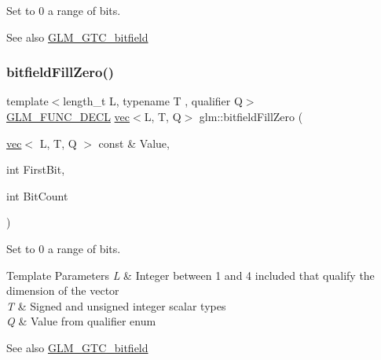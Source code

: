 Set to 0 a range of bits.

\begin{DoxySeeAlso}{See also}
\hyperlink{group__gtc__bitfield}{G\+L\+M\+\_\+\+G\+T\+C\+\_\+bitfield} 
\end{DoxySeeAlso}
\mbox{\label{group__gtc__bitfield_ga0d16c9acef4be79ea9b47c082a0cf7c2}} 
\subsubsection{\texorpdfstring{bitfield\+Fill\+Zero()}{bitfieldFillZero()}\hspace{0.1cm}{\footnotesize\ttfamily [2/2]}}
{\footnotesize\ttfamily template$<$length\+\_\+t L, typename T , qualifier Q$>$ \\
\hyperlink{setup_8hpp_ab2d052de21a70539923e9bcbf6e83a51}{G\+L\+M\+\_\+\+F\+U\+N\+C\+\_\+\+D\+E\+CL} \hyperlink{structglm_1_1vec}{vec}$<$L, T, Q$>$ glm\+::bitfield\+Fill\+Zero (\begin{DoxyParamCaption}\item[{\hyperlink{structglm_1_1vec}{vec}$<$ L, T, Q $>$ const \&}]{Value,  }\item[{int}]{First\+Bit,  }\item[{int}]{Bit\+Count }\end{DoxyParamCaption})}

Set to 0 a range of bits.


\begin{DoxyTemplParams}{Template Parameters}
{\em L} & Integer between 1 and 4 included that qualify the dimension of the vector \\
\hline
{\em T} & Signed and unsigned integer scalar types \\
\hline
{\em Q} & Value from qualifier enum\\
\hline
\end{DoxyTemplParams}
\begin{DoxySeeAlso}{See also}
\hyperlink{group__gtc__bitfield}{G\+L\+M\+\_\+\+G\+T\+C\+\_\+bitfield} 
\end{DoxySeeAlso}
\mbox{\label{group__gtc__bitfield_ga479134317bc95d99f2b2e235d3db287b}} 
